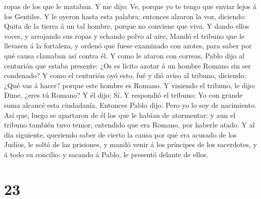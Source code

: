 ropas de los que le mataban.  Y me dijo: Ve, porque yo te
tengo que enviar lejos á los Gentiles.  Y le oyeron hasta
esta palabra: entonces alzaron la voz, diciendo: Quita de la tierra á un
tal hombre, porque no conviene que viva.  Y dando ellos
voces, y arrojando sus ropas y echando polvo al aire, 
Mandó el tribuno que le llevasen á la fortaleza, y ordenó que fuese
examinado con azotes, para saber por qué causa clamaban así contra él.
 Y como le ataron con correas, Pablo dijo al centurión
que estaba presente: ¿Os es lícito azotar á un hombre Romano sin ser
condenado?  Y como el centurión oyó esto, fué y dió aviso
al tribuno, diciendo: ¿Qué vas á hacer? porque este hombre es Romano.
 Y viniendo el tribuno, le dijo: Dime, ¿eres tú Romano? Y
él dijo: Sí.  Y respondió el tribuno: Yo con grande suma
alcancé esta ciudadanía. Entonces Pablo dijo: Pero yo lo soy de
nacimiento.  Así que, luego se apartaron de él los que le
habían de atormentar: y aun el tribuno también tuvo temor, entendido que
era Romano, por haberle atado.  Y al día siguiente,
queriendo saber de cierto la causa por qué era acusado de los Judíos, le
soltó de las prisiones, y mandó venir á los príncipes de los sacerdotes,
y á todo su concilio: y sacando á Pablo, le presentó delante de ellos.

\hypertarget{section-22}{%
\section{23}\label{section-22}}


